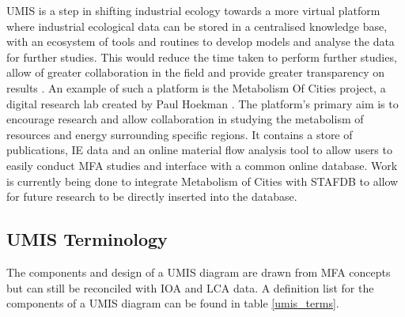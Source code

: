 \documentclass[ %
                    author={Tom Jager},
                supervisor={Dr. Daniel Schien},
                    degree={MEng},
                     title={A Bayesian Inference Engine for Calibrating Uncertainty over UMIS Structured MFA Systems},
                  subtitle={},
                      type={research},
                      year={2019} ]{dissertation}
\begin{document}
UMIS is a step in shifting industrial ecology towards a more virtual platform where industrial ecological data can be stored in a centralised knowledge base, with an ecosystem of tools and routines to develop models and analyse the data for further studies. This would reduce the time taken to perform further studies, allow of greater collaboration in the field and provide greater transparency on results \cite{hertwich2018nullius}. An example of such a platform is the Metabolism Of Cities project, a digital research lab created by Paul Hoekman \cite{MetabolismOfCities}. The platform's primary aim is to encourage research and allow collaboration in studying the metabolism of resources and energy surrounding specific regions. It contains a store of publications, IE data and an online material flow analysis tool to allow users to easily conduct MFA studies and interface with a common online database. Work is currently being done to integrate Metabolism of Cities with STAFDB to allow for future research to be directly inserted into the database. 

\subsection{UMIS Terminology}
The components and design of a UMIS diagram are drawn from MFA concepts but can still be reconciled with IOA and LCA data. A definition list for the components of a UMIS diagram can be found in table \ref{umis_terms}.
\end{document}

